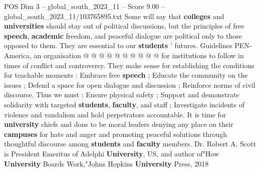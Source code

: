 \begin{textsample}{POS Dim 3 – global\_south\_2023\_11 – Score 9.00 – global\_south\_2023\_11/103765895.txt}
Some will say that \textbf{colleges} and \textbf{universities} should stay out of political discussions, but the principles of free \textbf{speech}, \textbf{academic} freedom, and peaceful dialogue are political only to those opposed to them.
They are essential to our \textbf{students} ' futures.
Guidelines PEN-America, an organisation @ @ @ @ @ @ @ @ @ @ for institutions to follow in times of conflict and controversy.
They make sense for establishing the conditions for teachable moments : Embrace free \textbf{speech} ; Educate the community on the issues ; Defend a space for open dialogue and discussion ; Reinforce norms of civil discourse.
Thus we must : Ensure physical safety ; Support and demonstrate solidarity with targeted \textbf{students}, \textbf{faculty}, and staff ; Investigate incidents of violence and vandalism and hold perpetrators accountable.
It is time for \textbf{university} chiefs and dons to be moral leaders denying any place on their \textbf{campuses} for hate and anger and promoting peaceful solutions through thoughtful discourse among \textbf{students} and \textbf{faculty} members.
Dr.
Robert A.
Scott is President Emeritus of Adelphi \textbf{University}, US, and author of"How \textbf{University} Boards Work,"Johns Hopkins \textbf{University} Press, 2018

\end{textsample}
